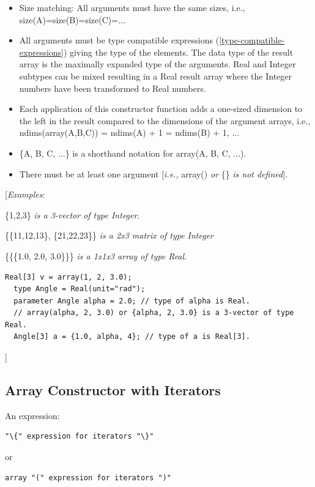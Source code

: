 \documentclass[10pt,a4paper]{report}
\def\doublelabel#1{\label{#1}}
\begin{document}
\begin{itemize}
\item
  Size matching: All arguments must have the same sizes, i.e.,
  size(A)=size(B)=size(C)=...
\item
  All arguments must be type compatible expressions (\ref{type-compatible-expressions}) giving
  the type of the elements. The data type of the result array is the
  maximally expanded type of the arguments. Real and Integer subtypes
  can be mixed resulting in a Real result array where the Integer
  numbers have been transformed to Real numbers.
\item
  Each application of this constructor function adds a one-sized
  dimension to the left in the result compared to the dimensions of the
  argument arrays, i.e., ndims(array(A,B,C)) = ndims(A) + 1 = ndims(B) +
  1, ...
\item
  \{A, B, C, ...\} is a shorthand notation for array(A, B, C, ...).
\item
  There must be at least one argument {[}\emph{i.e.,} array() \emph{or}
  \{\} \emph{is not defined}{]}.
\end{itemize}

{[}\emph{Examples}:

\{1,2,3\} \emph{is a 3-vector of type Integer}.

\{\{11,12,13\}, \{21,22,23\}\} \emph{is a 2x3 matrix of type Integer}

\{\{\{1.0, 2.0, 3.0\}\}\} \emph{is a 1x1x3 array of type Real}.

\begin{lstlisting}[language=modelica]
  Real[3] v = array(1, 2, 3.0);
  type Angle = Real(unit="rad");
  parameter Angle alpha = 2.0; // type of alpha is Real.
  // array(alpha, 2, 3.0) or {alpha, 2, 3.0} is a 3-vector of type Real.
  Angle[3] a = {1.0, alpha, 4}; // type of a is Real[3].
\end{lstlisting}
{]}

\subsection{Array Constructor with Iterators}\doublelabel{array-constructor-with-iterators}

An expression:
\begin{lstlisting}[language=grammar]
"\{" expression for iterators "\}"
\end{lstlisting}
or
\begin{lstlisting}[language=grammar]
array "(" expression for iterators ")"
\end{lstlisting}
\end{document}
